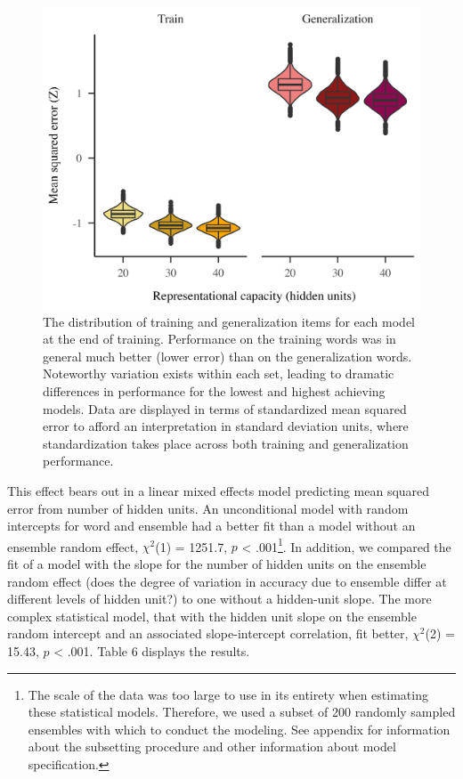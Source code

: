 \documentclass[
  ,man,floatsintext]{apa6}
\begin{document}
\begin{figure}
\includegraphics[width=10in]{img/results_figure3} \caption{The distribution of training and generalization items for each model at the end of training. Performance on the training words was in general much better (lower error) than on the generalization words. Noteworthy variation exists within each set, leading to dramatic differences in performance for the lowest and highest achieving models. Data are displayed in terms of standardized mean squared error to afford an interpretation in standard deviation units, where standardization takes place across both training and generalization performance.}\label{fig:figure3}
\end{figure}

This effect bears out in a linear mixed effects model predicting mean squared error from number of hidden units. An unconditional model with random intercepts for word and ensemble had a better fit than a model without an ensemble random effect, \(\chi^2\)(1) = 1251.7, \(p\) \textless{} .001\footnote{The scale of the data was too large to use in its entirety when estimating these statistical models. Therefore, we used a subset of 200 randomly sampled ensembles with which to conduct the modeling. See appendix for information about the subsetting procedure and other information about model specification.}. In addition, we compared the fit of a model with the slope for the number of hidden units on the ensemble random effect (does the degree of variation in accuracy due to ensemble differ at different levels of hidden unit?) to one without a hidden-unit slope. The more complex statistical model, that with the hidden unit slope on the ensemble random intercept and an associated slope-intercept correlation, fit better, \(\chi^2\)(2) = 15.43, \(p\) \textless{} .001. Table 6 displays the results.
\end{document}
